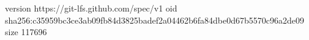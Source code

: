 version https://git-lfs.github.com/spec/v1
oid sha256:c35959bc3ce3ab09fb84d3825badef2a04462b6fa84dbe0d67b5570c96a2de09
size 117696
